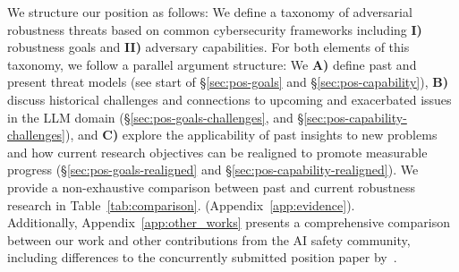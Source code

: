 We structure our position as follows: We define a taxonomy of adversarial robustness threats based on common cybersecurity frameworks including \textbf{I)} robustness goals and \textbf{II)} adversary capabilities. For both elements of this taxonomy, we follow a parallel argument structure: We \textbf{A)} define past and present threat models (see start of \S\ref{sec:pos-goals} and \S\ref{sec:pos-capability}), \textbf{B)} discuss historical challenges and connections to upcoming and exacerbated issues in the LLM domain (\S\ref{sec:pos-goals-challenges}, and \S\ref{sec:pos-capability-challenges}), and \textbf{C)} explore the applicability of past insights to new problems and how current research objectives can be realigned to promote measurable progress (\S\ref{sec:pos-goals-realigned} and \S\ref{sec:pos-capability-realigned}). We provide a non-exhaustive comparison between past and current robustness research in Table~\ref{tab:comparison}. (Appendix~\ref{app:evidence}). \\
Additionally, Appendix~\ref{app:other_works} presents a comprehensive comparison between our work and other contributions from the AI safety community, including differences to the concurrently submitted position paper by~\citet{rando2025adversarial}. %



